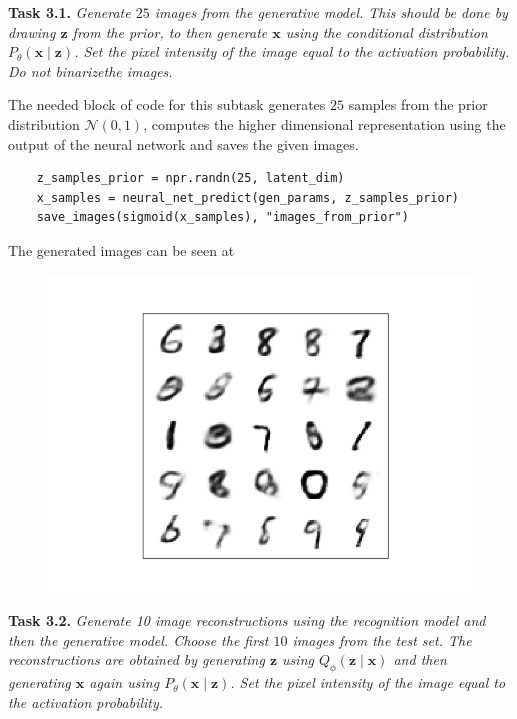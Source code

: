 \documentclass[11pt]{article}
\begin{document}
\textbf{Task 3.1.} \emph{Generate \( 25 \) images from the generative model. This should be done by drawing \( \bm{z} \) from the prior, to then generate \( \bm{x} \) using the conditional distribution \( P_{\theta}(\bm{x} \mid \bm{z}) \). Set the pixel intensity of the image equal to the activation probability. Do not binarizethe images.}

The needed block of code for this subtask generates \( 25 \) samples from the prior distribution \( \mathcal{N}(0, 1) \), computes the higher dimensional representation using the output of the neural network and saves the given images.

\begin{verbatim}
    z_samples_prior = npr.randn(25, latent_dim)
    x_samples = neural_net_predict(gen_params, z_samples_prior)
    save_images(sigmoid(x_samples), "images_from_prior")
\end{verbatim}

The generated images can be seen at
\begin{figure}[H]
  \centering
  \includegraphics[scale = 0.5]{imgs/images_from_prior.png}
\end{figure}


\textbf{Task 3.2.} \emph{Generate 10 image reconstructions using the recognition model and then the generative model. Choose the first \( 10 \)  images from the test set. The reconstructions are obtained by generating \( \bm{z} \)  using \( Q_{\phi}(\bm{z} \mid \bm{x}) \)  and then generating \( \bm{x} \)  again using \( P_{\theta}(\bm{x} \mid \bm{z}) \). Set the pixel intensity of the image equal to the activation probability.}
\end{document}
